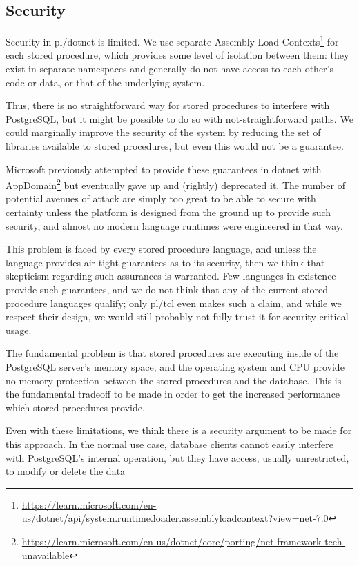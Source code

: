 \documentclass[sigconf,techreport,authorversion,nonacm]{acmart}
\begin{document}
\subsection{Security}

Security in pl/dotnet is limited. We use separate Assembly Load Contexts\footnote{\url{https://learn.microsoft.com/en-us/dotnet/api/system.runtime.loader.assemblyloadcontext?view=net-7.0}}
for each stored procedure, which provides some level of isolation
between them: they exist in separate namespaces and generally
do not have access to each other's code or data, or that of
the underlying system.

Thus, there is no straightforward way for stored procedures to
interfere with PostgreSQL, but it might be possible to do so with
not-straightforward paths. We could marginally improve the security
of the system by reducing the set of libraries available to
stored procedures, but even this would not be a guarantee.

Microsoft previously attempted to provide these guarantees in
dotnet with AppDomain\footnote{\url{https://learn.microsoft.com/en-us/dotnet/core/porting/net-framework-tech-unavailable}}
but eventually gave up and (rightly) deprecated it. The number
of potential avenues of attack are simply too great to be able
to secure with certainty unless the platform is designed
from the ground up to provide such security, and almost no modern
language runtimes were engineered in that way.

This problem is faced by every stored procedure language, and unless
the language provides air-tight guarantees as to its security, then
we think that skepticism regarding such assurances is warranted.
Few languages in existence provide such guarantees, and we do not
think that any of the current stored procedure languages qualify;
only pl/tcl even makes such a claim, and while we respect their
design, we would still probably not fully trust it for security-critical
usage.

The fundamental problem is that stored procedures are executing
inside of the PostgreSQL server's memory space, and the operating
system and CPU provide no memory protection between the stored
procedures and the database. This is the fundamental tradeoff to
be made in order to get the increased performance which stored
procedures provide.

Even with these limitations, we think there is a security argument
to be made for this approach. In the normal use case, database
clients cannot easily interfere with PostgreSQL's internal operation,
but they have access, usually unrestricted, to modify or delete the
data
\end{document}
